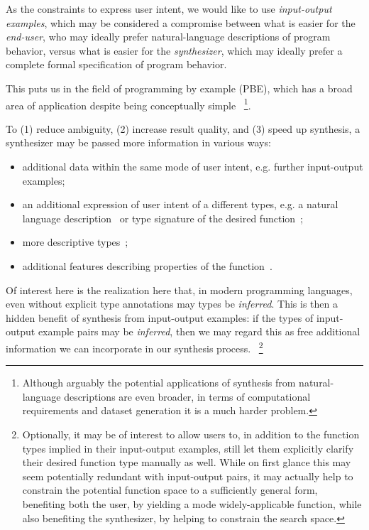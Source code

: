 \documentclass{article}
\begin{document}
As the constraints to express user intent, we would like to use \emph{input-output examples},
which may be considered a compromise between what is easier for the \emph{end-user},
who may ideally prefer natural-language descriptions of program behavior,
versus what is easier for the \emph{synthesizer},
which may ideally prefer a complete formal specification of program behavior.

This puts us in the field of programming by example (PBE),
which has a broad area of application despite being conceptually simple%
~\footnote{
    Although arguably the potential applications of synthesis from natural-language descriptions are even broader,
    in terms of computational requirements and dataset generation it is a much harder problem.
}.

To (1) reduce ambiguity, (2) increase result quality, and (3) speed up synthesis, a synthesizer may be passed more information in various ways:
\begin{itemize}
    \item additional data within the same mode of user intent, e.g. further input-output examples;
    \item an additional expression of user intent of a different types, e.g. a natural language description~\citep{polosukhin2018neural} or type signature of the desired function~\citep{myth};
    \item more descriptive types~\citep{synquid};
    \item additional features describing properties of the function~\citep{odena2020learning}.
\end{itemize}

Of interest here is the realization here that, in modern programming languages, even without explicit type annotations may types be \emph{inferred}.
This is then a hidden benefit of synthesis from input-output examples:
if the types of input-output example pairs may be \emph{inferred}, then we may regard this as free additional information we can incorporate in our synthesis process.%
~\footnote{
    Optionally, it may be of interest to allow users to,
    in addition to the function types implied in their input-output examples,
    still let them explicitly clarify their desired function type manually as well.
    While on first glance this may seem potentially redundant with input-output pairs,
    it may actually help to constrain the potential function space to a sufficiently general form,
    benefiting both the user,
    by yielding a mode widely-applicable function,
    while also benefiting the synthesizer,
    by helping to constrain the search space.
}
\end{document}
